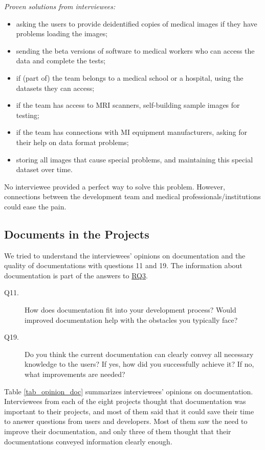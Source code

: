 \documentclass[preprint,12pt,authoryear]{elsarticle}
\begin{document}
\noindent\textit{Proven solutions from interviewees:}

\begin{itemize}
\item asking the users to provide deidentified copies of medical images if they
have problems loading the images;
\item sending the beta versions of software to medical workers who can access
the data and complete the tests;
\item if (part of) the team belongs to a medical school or a hospital, using the
datasets they can access;
\item if the team has access to MRI scanners, self-building sample images for
testing;
\item if the team has connections with MI equipment manufacturers, asking for
their help on data format problems;
\item storing all images that cause special problems, and maintaining this
special dataset over time.
\end{itemize}

No interviewee provided a perfect way to solve this problem. However,
connections between the development team and medical professionals/institutions
could ease the pain.

\subsection{Documents in the Projects} \label{sec_interview_documents}

We tried to understand the interviewees' opinions on documentation and the
quality of documentations with questions 11 and 19. The information about
documentation is part of the answers to \hyperlink{rq3}{RQ3}.

\begin{description}
\item[Q11.] How does documentation fit into your development process? Would
improved documentation help with the obstacles you typically face?
\item[Q19.] Do you think the current documentation can clearly convey all
necessary knowledge to the users? If yes, how did you successfully achieve it?
If no, what improvements are needed?
\end{description}

Table \ref{tab_opinion_doc} summarizes interviewees' opinions on documentation.
Interviewees from each of the eight projects thought that documentation was
important to their projects, and most of them said that it could save their time
to answer questions from users and developers. Most of them saw the need to
improve their documentation, and only three of them thought that their
documentations conveyed information clearly enough. 
\end{document}
